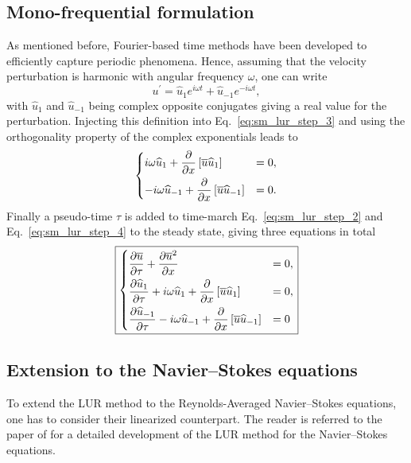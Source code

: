 \subsection{Mono-frequential formulation}
As mentioned before, Fourier-based time methods have been developed to efficiently
capture periodic phenomena.
Hence, assuming that the velocity perturbation is harmonic with 
angular frequency $\omega$, one can write
\begin{equation}
	u^\prime = \widehat{u}_1 e^{i \omega t} + \widehat{u}_{-1} e^{-i \omega t},
\end{equation}
with $\widehat{u}_1$ and $\widehat{u}_{-1}$ being complex opposite conjugates giving a
real value for the perturbation.
Injecting this definition into Eq.~\eqref{eq:sm_lur_step_3} and using
the orthogonality property of the complex exponentials leads
to
\begin{equation}
	\begin{dcases}
		i \omega \widehat{u}_1 +
		\frac{\partial}{\partial x} \left[
		\overline{u} \widehat{u}_1 \right] &= 
		0, \\
		-i \omega \widehat{u}_{-1} +
		\frac{\partial}{\partial x} \left[
		\overline{u} \widehat{u}_{-1} \right] &= 
		0.
	\end{dcases}
	\label{eq:sm_lur_step_4}
\end{equation}
Finally a pseudo-time $\tau$ is added to time-march 
Eq.~\eqref{eq:sm_lur_step_2} and Eq.~\eqref{eq:sm_lur_step_4}
to the steady state, giving three equations in total
\begin{alignat}{2}
	\fbox{$
	\begin{dcases}
		\frac{\partial \overline{u}}{\partial \tau} +
		\frac{\partial 
			\overline{u}^2}{\partial x} &= 0, \\
		\frac{\partial \widehat{u}_1}{\partial \tau} +
		i \omega \widehat{u}_1 +
			\frac{\partial}{\partial x} \left[
			\overline{u} \widehat{u}_1 \right] &= 
			0, \\
		\frac{\partial \widehat{u}_{-1}}{\partial \tau}
		-i \omega \widehat{u}_{-1} +
			\frac{\partial}{\partial x} \left[
			\overline{u} \widehat{u}_{-1} \right] &= 
			0
	\end{dcases}
	$}
\end{alignat}

\subsection{Extension to the Navier--Stokes equations}
To extend the LUR method to the Reynolds-Averaged
Navier--Stokes equations, one has to consider
their linearized counterpart.
The reader is referred to the paper of \citet{Clark2000} for
a detailed development of the LUR method for the Navier--Stokes
equations.

